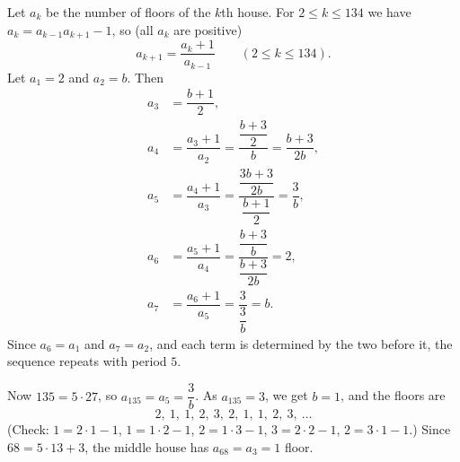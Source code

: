 Let $a_k$ be the number of floors of the $k$th house. For $2\le k\le134$ we have $a_k=a_{k-1}a_{k+1}-1$, so (all $a_k$ are positive)
\[a_{k+1}=\dfrac{a_k+1}{a_{k-1}}\qquad(2\le k\le134).\]
Let $a_1=2$ and $a_2=b$. Then
\begin{align*}
a_3&=\dfrac{b+1}{2},\\
a_4&=\dfrac{a_3+1}{a_2}=\dfrac{\dfrac{b+3}{2}}{b}=\dfrac{b+3}{2b},\\
a_5&=\dfrac{a_4+1}{a_3}=\dfrac{\dfrac{3b+3}{2b}}{\dfrac{b+1}{2}}=\dfrac{3}{b},\\
a_6&=\dfrac{a_5+1}{a_4}=\dfrac{\dfrac{b+3}{b}}{\dfrac{b+3}{2b}}=2,\\
a_7&=\dfrac{a_6+1}{a_5}=\dfrac{3}{\dfrac{3}{b}}=b .
\end{align*}
Since $a_6=a_1$ and $a_7=a_2$, and each term is determined by the two before it, the sequence repeats with period $5$.

Now $135=5\cdot27$, so $a_{135}=a_5=\dfrac{3}{b}$. As $a_{135}=3$, we get $b=1$, and the floors are
\[2,\ 1,\ 1,\ 2,\ 3,\ 2,\ 1,\ 1,\ 2,\ 3,\ \dots\]
(Check: $1=2\cdot1-1$, $1=1\cdot2-1$, $2=1\cdot3-1$, $3=2\cdot2-1$, $2=3\cdot1-1$.) Since $68=5\cdot13+3$, the middle house has $a_{68}=a_3=\boxed{1}$ floor.
